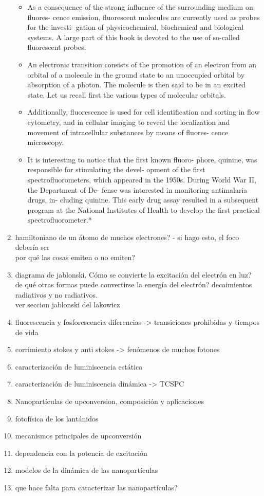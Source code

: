 \begin{enumerate}
\begin{itemize}
        \item As a consequence of the strong inﬂuence of the surrounding medium on ﬂuores- cence emission, ﬂuorescent molecules are currently used as probes for the investi- gation of physicochemical, biochemical and biological systems. A large part of this book is devoted to the use of so-called ﬂuorescent probes.
        \item An electronic transition consists of the promotion of an electron from an orbital of a molecule in the ground state to an unoccupied orbital by absorption of a photon. The molecule is then said to be in an excited state. Let us recall ﬁrst the various types of molecular orbitals.
        \item Additionally, fluorescence is used for cell identification and sorting in flow cytometry, and in cellular imaging to reveal the localization and movement of intracellular substances by means of fluores- cence microscopy.
        \item It is interesting to notice that the first known fluoro- phore, quinine, was responsible for stimulating the devel- opment of the first spectrofluorometers, which appeared in the 1950s. During World War II, the Department of De- fense was interested in monitoring antimalaria drugs, in- cluding quinine. This early drug assay resulted in a subsequent program at the National Institutes of Health to develop the first practical spectrofluorometer.*
    \end{itemize}
    \item hamiltoniano de un átomo de muchos electrones? - si hago esto, el foco debería ser \\
    por qué las cosas emiten o no emiten?
    \item diagrama de jablonski. Cómo se convierte la excitación del electrón en luz? \\
    de qué otras formas puede convertirse la energía del electrón?
    decaimientos radiativos y no radiativos. \\
    ver seccion jablonski del lakowicz
    \item fluorescencia y fosforescencia diferencias -> transiciones prohibidas y tiempos de vida
    \item corrimiento stokes y anti stokes -> fenómenos de muchos fotones
    \item caracterización de luminiscencia estática
    \item caracterización de luminiscencia dinámica -> TCSPC
    \item Nanopartículas de upconversion, composición y aplicaciones
    \item fotofísica de los lantánidos
    \item mecanismos principales de upconversión
    \item dependencia con la potencia de excitación
    \item modelos de la dinámica de las nanopartículas
    \item que hace falta para caracterizar las nanopartículas?
\end{enumerate}


